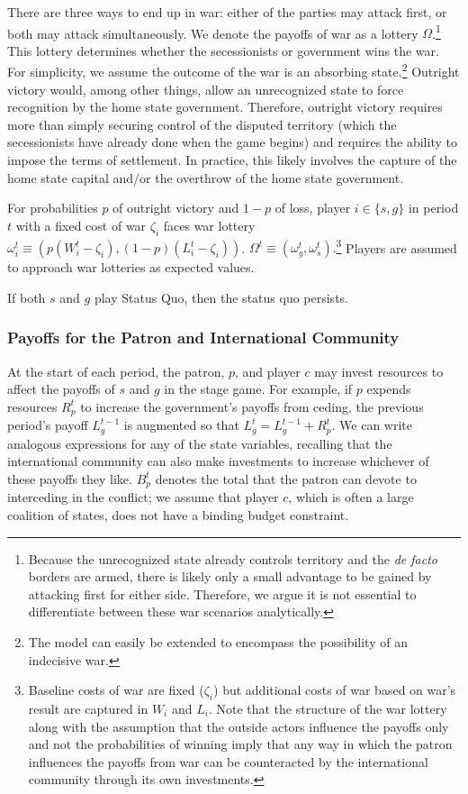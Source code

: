 \documentclass[11pt,letterpaper, notitlepage]{article}
\begin{document}
There are three ways to end up in war: either of the parties may attack first, or both may attack simultaneously. We denote the payoffs of war as a lottery $\Omega$.\footnote{Because the unrecognized state already controls territory and the \emph{de facto} borders are armed, there is likely only a small advantage to be gained by attacking first for either side. Therefore, we argue it is not essential to differentiate between these war scenarios analytically.} This lottery determines whether the secessionists or government wins the war. For simplicity, we assume the outcome of the war is an absorbing state.\footnote{The model can easily be extended to encompass the possibility of an indecisive war.} Outright victory would, among other things, allow an unrecognized state to force recognition by the home state government. Therefore, outright victory requires more than simply securing control of the disputed territory (which the secessionists have already done when the game begins) and requires the ability to impose the terms of settlement. In practice, this likely involves the capture of the home state capital and/or the overthrow of the home state government.

For probabilities $p$ of outright victory and $1-p$ of loss, player $i \in \{s, g\}$ in period $t$ with a fixed cost of war $\zeta_i$ faces war lottery $\omega_i^t \equiv (p (W_i^t-\zeta_i), \left(1-p\right)( L_i^t-\zeta_i))$. $\Omega^t \equiv (\omega_g^t, \omega_s^t).$\footnote{Baseline costs of war are fixed ($\zeta_i$) but additional costs of war based on war's result are captured in $W_i$ and $L_i$. Note that the structure of the war lottery along with the assumption that the outside actors influence the payoffs only and not the probabilities of winning imply that any way in which the patron influences the payoffs from war can be counteracted by the international community through its own investments.} Players are assumed to approach war lotteries as expected values.

If both $s$ and $g$ play Status Quo, then the status quo persists.


\subsubsection{Payoffs for the Patron and International Community}

At the start of each period, the patron, $p$, and player $c$ may invest resources to affect the payoffs of $s$ and $g$ in the stage game. For example, if $p$ expends resources $R_p^t$ to increase the government's payoffs from ceding, the previous period's payoff $L_g^{t-1}$ is augmented so that $L_g^t = L_g^{t-1} + R_p^t$. We can write analogous expressions for any of the state variables, recalling that the international community can also make investments to increase whichever of these payoffs they like. $B_p^t$ denotes the total that the patron can devote to interceding in the conflict; we assume that player $c$, which is often a large coalition of states, does not have a binding budget constraint.
\end{document}
